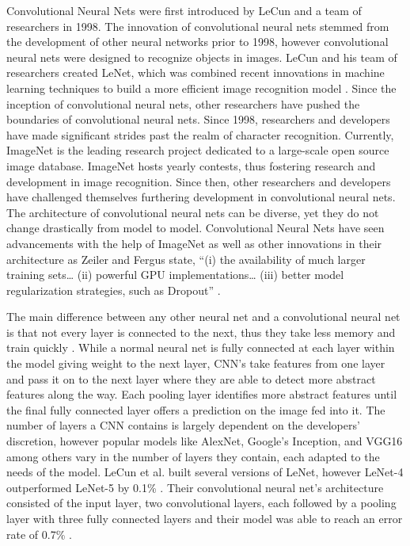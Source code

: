 \documentclass[12pt,english]{article}
\begin{document}
Convolutional Neural Nets were first introduced by LeCun and a team of researchers in 1998. The innovation of convolutional neural nets stemmed from the development of other neural networks prior to 1998, however convolutional neural nets were designed to recognize objects in images. LeCun and his team of researchers created LeNet, which was combined recent innovations in machine learning techniques to build a more efficient image recognition model \citep{lecun-98}. Since the inception of convolutional neural nets, other researchers have pushed the boundaries of convolutional neural nets. Since 1998, researchers and developers have made significant strides past the realm of character recognition. Currently, ImageNet is the leading research project dedicated to a large-scale open source image database. ImageNet hosts yearly contests, thus fostering research and development in image recognition. Since then, other researchers and developers have challenged themselves furthering development in convolutional neural nets. The architecture of convolutional neural nets can be diverse, yet they do not change drastically from model to model. Convolutional Neural Nets have seen advancements with the help of ImageNet as well as other innovations in their architecture as Zeiler and Fergus state, ``(i) the availability of much larger training sets… (ii) powerful GPU implementations… (iii) better model regularization strategies, such as Dropout'' \citep{DBLP:journals/corr/ZeilerF13}. \par

The main difference between any other neural net and a convolutional neural net is that not every layer is connected to the next, thus they take less memory and train quickly \citep{lecun-98}. While a normal neural net is fully connected at each layer within the model giving weight to the next layer, CNN’s take features from one layer and pass it on to the next layer where they are able to detect more abstract features along the way. Each pooling layer identifies more abstract features until the final fully connected layer offers a prediction on the image fed into it. The number of layers a CNN contains is largely dependent on the developers’ discretion, however popular models like AlexNet, Google’s Inception, and VGG16 among others vary in the number of layers they contain, each adapted to the needs of the model. 
LeCun et al. built several versions of LeNet, however LeNet-4 outperformed LeNet-5 by 0.1\% \citep{lecun-98}. Their convolutional neural net’s architecture consisted of the input layer, two convolutional layers, each followed by a pooling layer with three fully connected layers and their model was able to reach an error rate of 0.7\% \citep{lecun-98}.\par
\end{document}
